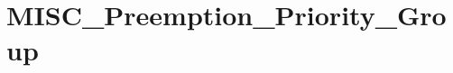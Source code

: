 \hypertarget{group___m_i_s_c___preemption___priority___group}{\section{M\-I\-S\-C\-\_\-\-Preemption\-\_\-\-Priority\-\_\-\-Group}
\label{group___m_i_s_c___preemption___priority___group}
}
